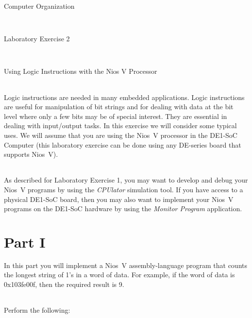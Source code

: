 \documentclass[epsfig,10pt,fullpage]{article}
\newcommand{\LabNum}{2}
\begin{document}
\centerline{\huge Computer Organization}
~\\
\centerline{\huge Laboratory Exercise \LabNum}
~\\
\centerline{\large Using Logic Instructions with the Nios\textsuperscript{\textregistered} V Processor}
~\\

Logic instructions are needed in many embedded applications.  Logic instructions are useful 
for manipulation of bit strings and for dealing with data at the bit level where only a 
few bits may be of special interest. They are essential in dealing with input/output tasks.
In this exercise we will consider some typical uses. We will assume that you are using the 
Nios\textsuperscript{\textregistered}~V processor in the DE1-SoC Computer (this
laboratory exercise can be done using any DE-series board that supports Nios~V).

~\\
As described for Laboratory Exercise 1, you may want to develop and debug your Nios~V
programs by using the {\it CPUlator} simulation tool. If you have access to a physical DE1-SoC
board, then you may also want to implement your Nios~V programs on the DE1-SoC hardware by 
using the {\it Monitor Program} application.

\section*{Part I}
In this part you will implement a Nios~V assembly-language program that counts the longest 
string of 1's in a word of data. For example, if the word of data is {\sf 0x103fe00f}, then 
the required result is 9.

~\\
Perform the following:
\end{document}

